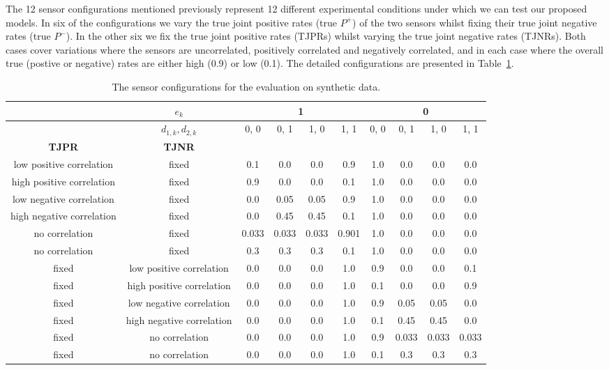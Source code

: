 The 12 sensor configurations mentioned previously represent 12 different experimental conditions under which we can test our proposed models. In six of the configurations we vary the true joint positive rates (true $P^+$) of the two sensors whilst fixing their true joint negative rates (true $P^-$). In the other six we fix the true joint positive rates (TJPRs) whilst varying the true joint negative rates (TJNRs). Both cases cover variations where the sensors are uncorrelated, positively correlated and negatively correlated, and in each case where the overall true (postive or negative) rates are either high (0.9) or low (0.1). The detailed configurations are presented in Table~\ref{tab:eval_sim}. 

\begin{table}
\begin{center}
 \begin{tabular}{| c | c || c | c | c | c || c | c | c | c|} 
 \hline
     & $e_k$ &  \multicolumn{4}{|c||}{1} &  \multicolumn{4}{c|}{0} \\
 \hline
 & $d_{1,k}, d_{2,k}$  & 0, 0 & 0, 1 & 1, 0 & 1, 1 & 0, 0 & 0, 1 & 1, 0  & 1, 1\\  
 \hline\hline
 \textbf{TJPR} & \textbf{TJNR} &  &  &  &  &  &  &  & \\  
 \hline
 \hline
 low positive correlation & fixed & 0.1 & 0.0 & 0.0 & 0.9 & 1.0 & 0.0 & 0.0 & 0.0\\  
 \hline
 high positive correlation & fixed & 0.9 & 0.0 & 0.0 & 0.1 & 1.0 & 0.0 & 0.0 & 0.0\\  
 \hline
 low negative correlation & fixed & 0.0 & 0.05 & 0.05 & 0.9 & 1.0 & 0.0 & 0.0 & 0.0\\  
 \hline
 high negative correlation & fixed & 0.0 & 0.45 & 0.45 & 0.1 & 1.0 & 0.0 & 0.0 & 0.0\\  
 \hline
 no correlation & fixed & 0.033 & 0.033 & 0.033 & 0.901 & 1.0 & 0.0 & 0.0 & 0.0\\  
 \hline
 no correlation & fixed & 0.3 & 0.3 & 0.3 & 0.1 & 1.0 & 0.0 & 0.0 & 0.0\\  
 \hline
 fixed & low positive correlation  & 0.0 & 0.0 & 0.0 & 1.0 & 0.9 & 0.0 & 0.0 & 0.1\\  
 \hline
 fixed & high positive correlation  & 0.0 & 0.0 & 0.0 & 1.0 & 0.1 & 0.0 & 0.0 & 0.9\\  
 \hline
 fixed & low negative correlation  & 0.0 & 0.0 & 0.0 & 1.0 & 0.9 & 0.05 & 0.05 & 0.0\\  
 \hline
 fixed & high negative correlation  & 0.0 & 0.0 & 0.0 & 1.0 & 0.1 & 0.45 & 0.45 & 0.0\\  
 \hline
 fixed & no correlation  & 0.0 & 0.0 & 0.0 & 1.0 & 0.9 & 0.033 & 0.033 & 0.033\\  
 \hline
 fixed & no correlation  & 0.0 & 0.0 & 0.0 & 1.0 & 0.1 & 0.3 & 0.3 & 0.3\\  
 \hline
\end{tabular}
\end{center}
\caption{The sensor configurations for the evaluation on synthetic data.}
\label{tab:eval_sim}
\end{table}


